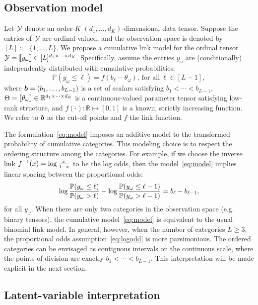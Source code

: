 \documentclass{article}
\theoremstyle{plain}
\theoremstyle{definition}
\begin{document}
\subsection{Observation model}
\vspace{-.2cm}
Let $\mathcal{Y}$ denote an order-$K$ $(d_1,\ldots,d_K)$-dimensional data tensor. Suppose the entries of $\mathcal{Y}$ are ordinal-valued, and the observation space is denoted by $[L]:=\{1,\ldots,L\}$. We propose a cumulative link model for the ordinal tensor $\mathcal{Y}=\llbracket y_\omega \rrbracket\in[L]^{d_1\times \cdots\times d_K}$. Specifically, assume the entries $y_\omega$ are (conditionally) independently distributed with cumulative probabilities:
\begin{equation}\label{eq:model}
\mathbb{P}(y_\omega\leq \ell)=f(b_\ell-\theta_\omega),\ \text{for all}\ \ell\in[L-1],
\end{equation}
where $\bm{b}=(b_1,\ldots,b_{L-1})$ is a set of  scalars satisfying $b_1<\cdots <b_{L-1}$, $\Theta=\llbracket \theta_\omega \rrbracket\in\mathbb{R}^{d_1\times \cdots \times d_K}$ is a continuous-valued parameter tensor satisfying  low-rank structure, and $f(\cdot):\mathbb{R}\mapsto[0,1]$ is a known, strictly increasing function. We refer to $\bm{b}$ as the cut-off points and $f$ the link function.

The formulation~\eqref{eq:model} imposes an additive model to the transformed probability of cumulative categories. This modeling choice is to respect the ordering structure among the categories. For example, if we choose the inverse link $f^{-1}(x)=\log {x\over 1-x}$ to be the log odds, then the model~\eqref{eq:model} implies linear spacing between the proportional odds:
\begin{equation}\label{eq:logodd}
\log {\mathbb{P}(y_{\omega}\leq \ell) \over \mathbb{P}(y_\omega >  \ell) } - \log {\mathbb{P}(y_{\omega}\leq {\ell-1}) \over \mathbb{P}(y_\omega >  {\ell-1}) } = b_\ell-b_{\ell-1},
\end{equation}
for all $y_\omega$. When there are only two categories in the observation space (e.g. binary tensors), the cumulative model~\eqref{eq:model} is equivalent to the usual binomial link model. In general, however, when the number of categories $L\geq 3$, the proportional odds assumption~\eqref{eq:logodd} is more parsimonious. The ordered categories can be envisaged as contiguous intervals on the continuous scale, where the points of division are exactly $b_1<\cdots <b_{L-1}$. This interpretation will be made explicit in the next section.
\vspace{-.2cm}
\subsection{Latent-variable interpretation}\label{sec:latent}
\vspace{-.2cm}
\end{document}
